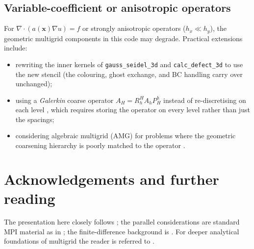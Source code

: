 \documentclass[11pt]{article}
\theoremstyle{definition}
\newcommand{\bx}{\mathbf{x}}
\begin{document}
\subsection{Variable-coefficient or anisotropic operators}\label{sec:variable}
For $\nabla\!\cdot\!(a(\bx)\nabla u) = f$ or strongly anisotropic
operators ($h_x \ll h_y$), the geometric multigrid components in this
code may degrade.  Practical extensions include:
\begin{itemize}[leftmargin=*,nosep]
\item rewriting the inner kernels of \texttt{gauss\_seidel\_3d} and
  \texttt{calc\_defect\_3d} to use the new stencil (the colouring,
  ghost exchange, and BC handling carry over unchanged);
\item using a \emph{Galerkin} coarse operator $A_H = R_h^H A_h
  P_H^h$ instead of re-discretising on each level
  \cite[\S5.4]{trottenberg2001multigrid}, which requires storing the
  operator on every level rather than just the spacings;
\item considering algebraic multigrid (AMG) for problems where the
  geometric coarsening hierarchy is poorly matched to the operator
  \cite[Appx.~A]{trottenberg2001multigrid}.
\end{itemize}

\section*{Acknowledgements and further reading}
The presentation here closely follows
\cite{briggs2000multigrid,trottenberg2001multigrid}; the parallel
considerations are standard MPI material as in
\cite{gropp2014using}; the finite-difference background is
\cite{leveque2007finite}.  For deeper analytical foundations of
multigrid the reader is referred to \cite{hackbusch1985multi}.
\end{document}

